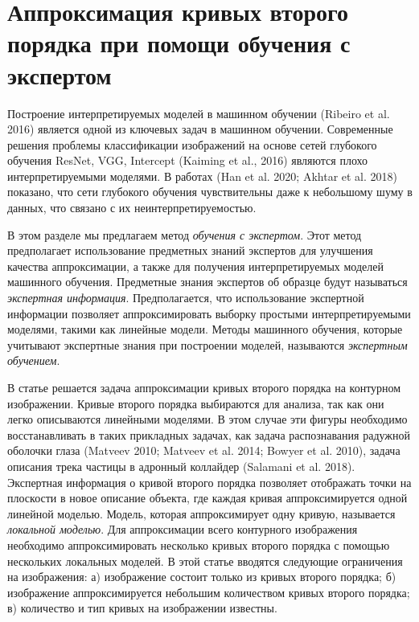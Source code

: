\newpage

\section{Аппроксимация кривых второго порядка при помощи обучения с экспертом}
Построение интерпретируемых моделей в машинном обучении (Ribeiro et al. 2016) является одной из ключевых задач в машинном обучении.
Современные решения проблемы классификации изображений на основе сетей глубокого обучения ResNet, VGG, Intercept (Kaiming et al., 2016) являются плохо интерпретируемыми моделями.
В работах (Han et al. 2020; Akhtar et al. 2018)  показано, что сети глубокого обучения чувствительны даже к небольшому шуму в данных, что связано с их неинтерпретируемостью.

В этом разделе мы предлагаем метод \textit{обучения с экспертом}.
Этот метод предполагает использование предметных знаний экспертов для улучшения качества аппроксимации, а также для получения интерпретируемых моделей машинного обучения.
Предметные знания экспертов об образце будут называться \textit{экспертная информация}.
Предполагается, что использование экспертной информации позволяет аппроксимировать выборку простыми интерпретируемыми моделями, такими как линейные модели. Методы машинного обучения, которые учитывают экспертные знания при построении моделей, называются \textit{экспертным обучением}.


В статье решается задача аппроксимации кривых второго порядка на контурном изображении. Кривые второго порядка выбираются для анализа, так как они легко описываются линейными моделями. В этом случае эти фигуры необходимо восстанавливать в таких прикладных задачах, как задача распознавания радужной оболочки глаза (Matveev 2010; Matveev et al. 2014; Bowyer et al. 2010), задача описания трека частицы в адронный коллайдер (Salamani et al. 2018). Экспертная информация о кривой второго порядка позволяет отображать точки на плоскости в новое описание объекта, где каждая кривая аппроксимируется одной линейной моделью. Модель, которая аппроксимирует одну кривую, называется \textit{локальной моделью}. Для аппроксимации всего контурного изображения необходимо аппроксимировать несколько кривых второго порядка с помощью нескольких локальных моделей. В этой статье вводятся следующие ограничения на изображения: а) изображение состоит только из кривых второго порядка; б) изображение аппроксимируется небольшим количеством кривых второго порядка; в) количество и тип кривых на изображении известны.

